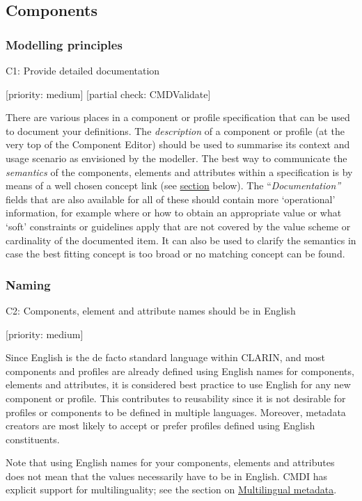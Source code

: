 \subsection{Components}\label{components}

\subsubsection{Modelling principles}\label{modelling-principles}

C1: Provide detailed documentation

{[}priority: medium{]} {[}partial check: CMDValidate{]}

There are various places in a component or profile specification that
can be used to document your definitions. The \emph{description} of a
component or profile (at the very top of the Component Editor) should be
used to summarise its context and usage scenario as envisioned by the
modeller. The best way to communicate the \emph{semantics} of the
components, elements and attributes within a specification is by means
of a well chosen concept link (see \protect\hyperlink{concepts}{section}
below). The ``\emph{Documentation''} fields that are also available for
all of these should contain more `operational' information, for example
where or how to obtain an appropriate value or what `soft' constraints
or guidelines apply that are not covered by the value scheme or
cardinality of the documented item. It can also be used to clarify the
semantics in case the best fitting concept is too broad or no matching
concept can be found.

\subsubsection{Naming}\label{naming}

C2: Components, element and attribute names should be in English

{[}priority: medium{]}

Since English is the de facto standard language within CLARIN, and most
components and profiles are already defined using English names for
components, elements and attributes, it is considered best practice to
use English for any new component or profile. This contributes to
reusability since it is not desirable for profiles or components to be
defined in multiple languages. Moreover, metadata creators are most
likely to accept or prefer profiles defined using English constituents.

Note that using English names for your components, elements and
attributes does not mean that the values necessarily have to be in
English. CMDI has explicit support for multilinguality; see the section
on
\href{../common_approachesproblems/multilingual_metadata.md}{Multilingual
metadata}.

